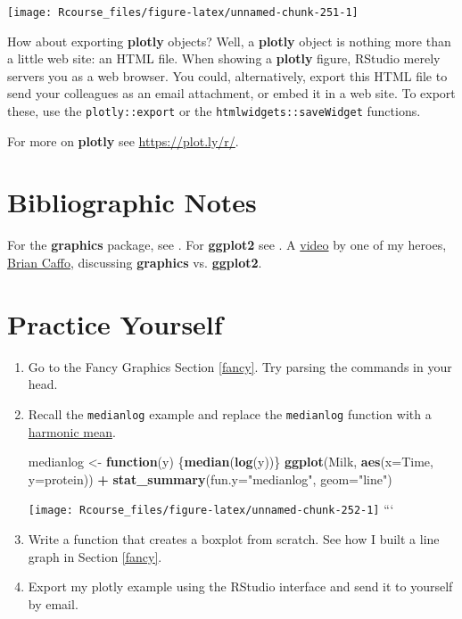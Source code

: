 \documentclass[]{book}
\newenvironment{Shaded}{\begin{snugshade}}{\end{snugshade}}
\newcommand{\KeywordTok}[1]{\textcolor[rgb]{0.13,0.29,0.53}{\textbf{#1}}}
\newcommand{\DataTypeTok}[1]{\textcolor[rgb]{0.13,0.29,0.53}{#1}}
\newcommand{\StringTok}[1]{\textcolor[rgb]{0.31,0.60,0.02}{#1}}
\newcommand{\ControlFlowTok}[1]{\textcolor[rgb]{0.13,0.29,0.53}{\textbf{#1}}}
\newcommand{\OperatorTok}[1]{\textcolor[rgb]{0.81,0.36,0.00}{\textbf{#1}}}
\newcommand{\NormalTok}[1]{#1}
\theoremstyle{definition}
\theoremstyle{definition}
\theoremstyle{definition}
\theoremstyle{remark}
\begin{document}
\texttt{[image: Rcourse\_files/figure-latex/unnamed-chunk-251-1]}

How about exporting \textbf{plotly} objects? Well, a \textbf{plotly}
object is nothing more than a little web site: an HTML file. When
showing a \textbf{plotly} figure, RStudio merely servers you as a web
browser. You could, alternatively, export this HTML file to send your
colleagues as an email attachment, or embed it in a web site. To export
these, use the \texttt{plotly::export} or the
\texttt{htmlwidgets::saveWidget} functions.

For more on \textbf{plotly} see \url{https://plot.ly/r/}.

\section{Bibliographic Notes}\label{bibliographic-notes-8}

For the \textbf{graphics} package, see \citet{Rlanguage}. For
\textbf{ggplot2} see \citet{ggplot2}. A
\href{https://www.youtube.com/watch?v=9Objw9Tvhb4\&feature=youtu.be}{video}
by one of my heroes, \href{http://www.bcaffo.com/}{Brian Caffo},
discussing \textbf{graphics} vs. \textbf{ggplot2}.

\section{Practice Yourself}\label{practice-yourself-8}

\begin{enumerate}
\def\labelenumi{\arabic{enumi}.}
\item
  Go to the Fancy Graphics Section \ref{fancy}. Try parsing the commands
  in your head.
\item
  Recall the \texttt{medianlog} example and replace the
  \texttt{medianlog} function with a
  \href{https://en.wikipedia.org/wiki/Harmonic_mean}{harmonic mean}.

\begin{Shaded}
\begin{Highlighting}[]
\NormalTok{medianlog <-}\StringTok{ }\ControlFlowTok{function}\NormalTok{(y) \{}\KeywordTok{median}\NormalTok{(}\KeywordTok{log}\NormalTok{(y))\}}
\KeywordTok{ggplot}\NormalTok{(Milk, }\KeywordTok{aes}\NormalTok{(}\DataTypeTok{x=}\NormalTok{Time, }\DataTypeTok{y=}\NormalTok{protein)) }\OperatorTok{+}
\StringTok{  }\KeywordTok{stat_summary}\NormalTok{(}\DataTypeTok{fun.y=}\StringTok{"medianlog"}\NormalTok{, }\DataTypeTok{geom=}\StringTok{"line"}\NormalTok{)}
\end{Highlighting}
\end{Shaded}

  \texttt{[image: Rcourse\_files/figure-latex/unnamed-chunk-252-1]}
  ```
\item
  Write a function that creates a boxplot from scratch. See how I built
  a line graph in Section \ref{fancy}.
\item
  Export my plotly example using the RStudio interface and send it to
  yourself by email.
\end{enumerate}
\end{document}
